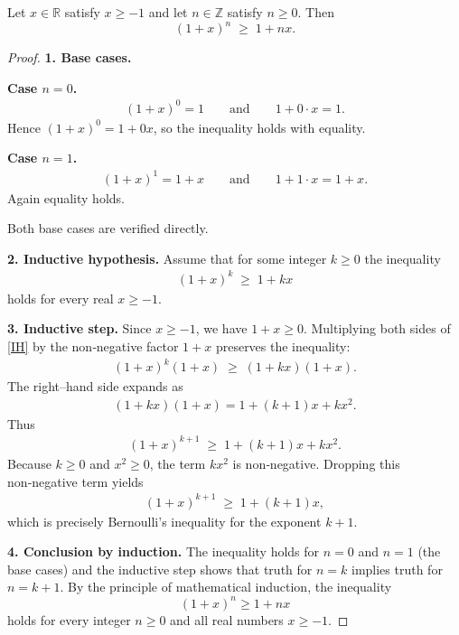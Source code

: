\begin{theorem}
Let $x\in\mathbb{R}$ satisfy $x\ge -1$ and let $n\in\mathbb{Z}$ satisfy $n\ge 0$. Then
\[
(1+x)^{n}\;\ge\;1+nx .
\]
\end{theorem}

\begin{proof}
\textbf{1. Base cases.}  

\textbf{Case $n=0$.}  
\begin{align*}
(1+x)^{0}=1 \qquad\text{and}\qquad 1+0\cdot x = 1 .
\end{align*}
Hence $(1+x)^{0}=1+0x$, so the inequality holds with equality.

\textbf{Case $n=1$.}  
\begin{align*}
(1+x)^{1}=1+x \qquad\text{and}\qquad 1+1\cdot x = 1+x .
\end{align*}
Again equality holds.

Both base cases are verified directly.

\medskip

\textbf{2. Inductive hypothesis.}  
Assume that for some integer $k\ge 0$ the inequality
\begin{align}
(1+x)^{k}\;\ge\;1+kx \tag{IH}
\end{align}
holds for every real $x\ge -1$.

\medskip

\textbf{3. Inductive step.}  
Since $x\ge -1$, we have $1+x\ge 0$. Multiplying both sides of \eqref{IH} by the non‑negative factor $1+x$ preserves the inequality:
\begin{align}
(1+x)^{k}(1+x)\;\ge\;(1+kx)(1+x). \tag{1}
\end{align}
The right–hand side expands as
\begin{align}
(1+kx)(1+x)=1+(k+1)x+kx^{2}. \tag{2}
\end{align}
Thus
\begin{align}
(1+x)^{k+1}\;\ge\;1+(k+1)x+kx^{2}. \tag{3}
\end{align}
Because $k\ge 0$ and $x^{2}\ge 0$, the term $kx^{2}$ is non‑negative. Dropping this non‑negative term yields
\begin{align}
(1+x)^{k+1}\;\ge\;1+(k+1)x,
\end{align}
which is precisely Bernoulli’s inequality for the exponent $k+1$.

\medskip

\textbf{4. Conclusion by induction.}  
The inequality holds for $n=0$ and $n=1$ (the base cases) and the inductive step shows that truth for $n=k$ implies truth for $n=k+1$. By the principle of mathematical induction, the inequality
\[
(1+x)^{n}\ge 1+nx
\]
holds for every integer $n\ge 0$ and all real numbers $x\ge -1$.


\end{proof}
